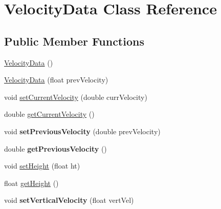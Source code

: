 \hypertarget{classVelocityData}{\section{Velocity\+Data Class Reference}
\label{classVelocityData}
}
\subsection*{Public Member Functions}
\begin{DoxyCompactItemize}
\item 
\hyperlink{classVelocityData_a4970785a66073c7d17846a47b1a3cfc3}{Velocity\+Data} ()
\item 
\hyperlink{classVelocityData_a6ae1537267143c3787cd8a9275fe425d}{Velocity\+Data} (float prev\+Velocity)
\item 
void \hyperlink{classVelocityData_aa95575920930885a19267e632c6c0f9f}{set\+Current\+Velocity} (double curr\+Velocity)
\item 
double \hyperlink{classVelocityData_a01eeedf5e8584a62fed10d551f242a96}{get\+Current\+Velocity} ()
\item 
\hypertarget{classVelocityData_ade4a9722cf92adac82466749111f1810}{void {\bfseries set\+Previous\+Velocity} (double prev\+Velocity)}\label{classVelocityData_ade4a9722cf92adac82466749111f1810}

\item 
\hypertarget{classVelocityData_a230c68fa99c60c9f079dd754b8799412}{double {\bfseries get\+Previous\+Velocity} ()}\label{classVelocityData_a230c68fa99c60c9f079dd754b8799412}

\item 
void \hyperlink{classVelocityData_a897d309819bc13ec13f8df7b97cd68e4}{set\+Height} (float ht)
\item 
float \hyperlink{classVelocityData_a82e8e8076a43a580a3a920d5d8817a90}{get\+Height} ()
\item 
\hypertarget{classVelocityData_ab112e4df6fc431bd04e8c498451477cc}{void {\bfseries set\+Vertical\+Velocity} (float vert\+Vel)}\label{classVelocityData_ab112e4df6fc431bd04e8c498451477cc}


\end{DoxyCompactItemize}
